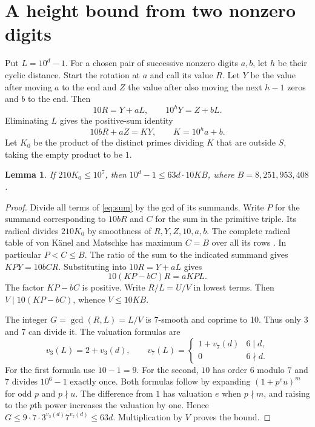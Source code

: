 \documentclass[11pt,letterpaper]{article}
\newtheorem{lemma}[theorem]{Lemma}
\begin{document}
\section{A height bound from two nonzero digits}
Put $L=10^d-1$. For a chosen pair of successive nonzero digits $a,b$, let $h$ be their cyclic distance. Start the rotation at $a$ and call its value $R$. Let $Y$ be the value after moving $a$ to the end and $Z$ the value after also moving the next $h-1$ zeros and $b$ to the end. Then
\[
 10R=Y+aL,\qquad 10^hY=Z+bL.
\]
Eliminating $L$ gives the positive-sum identity
\begin{equation}\label{eq:sum}
 10bR+aZ=KY,\qquad K=10^h a+b .
\end{equation}
Let $K_0$ be the product of the distinct primes dividing $K$ that are outside $S$, taking the empty product to be $1$.

\begin{lemma}\label{lem:bound}
If $210K_0\le10^7$, then $10^d-1\le 63d\cdot 10K B$, where $B=8{,}251{,}953{,}408$.
\end{lemma}
\begin{proof}
Divide all terms of \eqref{eq:sum} by the gcd of its summands. Write $P$ for the summand corresponding to $10bR$ and $C$ for the sum in the primitive triple. Its radical divides $210K_0$ by smoothness of $R,Y,Z,10,a,b$. The complete radical table of von K\"anel and Matschke has maximum $C=B$ over all its rows \cite{data}. In particular $P<C\le B$. The ratio of the sum to the indicated summand gives $KP Y=10bC R$. Substituting into $10R=Y+aL$ gives
\[
 10(KP-bC)R=aKP L .
\]
The factor $KP-bC$ is positive. Write $R/L=U/V$ in lowest terms. Then $V\mid10(KP-bC)$, whence $V\le10KB$.

The integer $G=\gcd(R,L)=L/V$ is 7-smooth and coprime to 10. Thus only 3 and 7 can divide it. The valuation formulas are
\[
 v_3(L)=2+v_3(d),\qquad
 v_7(L)=
 \begin{cases}1+v_7(d)&6\mid d,\\0&6\nmid d.\end{cases}
\]
For the first formula use $10-1=9$. For the second, $10$ has order $6$ modulo $7$ and $7$ divides $10^6-1$ exactly once. Both formulas follow by expanding $(1+p^e u)^m$ for odd $p$ and $p\nmid u$. The difference from $1$ has valuation $e$ when $p\nmid m$, and raising to the $p$th power increases the valuation by one. Hence $G\le9\cdot7\cdot3^{v_3(d)}7^{v_7(d)}\le63d$. Multiplication by $V$ proves the bound.
\end{proof}
\end{document}
